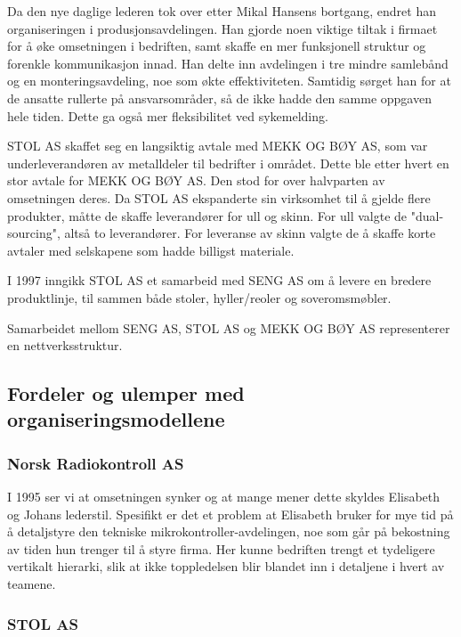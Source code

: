 Da den nye daglige lederen tok over etter Mikal Hansens bortgang, endret han organiseringen i produsjonsavdelingen.
Han gjorde noen viktige tiltak i firmaet for å øke omsetningen i bedriften, samt skaffe en mer funksjonell struktur og forenkle kommunikasjon innad.
Han delte inn avdelingen i tre mindre samlebånd og en monteringsavdeling, noe som økte effektiviteten. Samtidig sørget han for at de ansatte rullerte på ansvarsområder, så de ikke hadde den samme oppgaven hele tiden. Dette ga også mer fleksibilitet ved sykemelding.

STOL AS skaffet seg en langsiktig avtale med MEKK OG BØY AS, som var underleverandøren av metalldeler til bedrifter i området. Dette ble etter hvert en stor avtale for MEKK OG BØY AS. Den stod for over halvparten av omsetningen deres. Da STOL AS ekspanderte sin virksomhet til å gjelde flere produkter, måtte de skaffe leverandører for ull og skinn. For ull valgte de "dual-sourcing", altså to leverandører. For leveranse av skinn valgte de å skaffe korte avtaler med selskapene som hadde billigst materiale.

I 1997 inngikk STOL AS et samarbeid med SENG AS om å levere en bredere produktlinje, til sammen både stoler, hyller/reoler og soveromsmøbler.

Samarbeidet mellom SENG AS, STOL AS og MEKK OG BØY AS representerer en nettverksstruktur.

\subsection{Fordeler og ulemper med organiseringsmodellene}

\subsubsection{Norsk Radiokontroll AS}

I 1995 ser vi at omsetningen synker og at mange mener dette skyldes Elisabeth og Johans lederstil. Spesifikt er det et problem at Elisabeth bruker for mye tid på å detaljstyre den tekniske mikrokontroller-avdelingen, noe som går på bekostning av tiden hun trenger til å styre firma.
Her kunne bedriften trengt et tydeligere vertikalt hierarki, slik at ikke toppledelsen blir blandet inn i detaljene i hvert av teamene.

\subsubsection{STOL AS}

